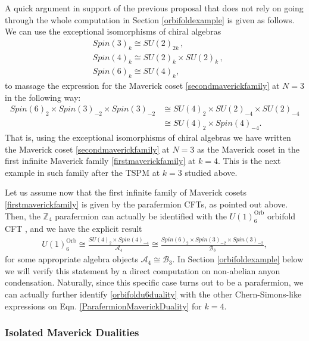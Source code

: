 \documentclass[11pt]{article}
\numberwithin{equation}{section}
\begin{document}
A quick argument in support of the previous proposal that does not rely on going through the whole computation in Section \ref{orbifoldexample} is given as follows. We can use the exceptional isomorphisms of chiral algebras
\begin{align}
    &Spin(3)_{k} \cong SU(2)_{2k} \, , \\[0.3cm]
    &Spin(4)_{k} \cong SU(2)_{k} \times SU(2)_{k} \, ,  \\[0.3cm]
    &Spin(6)_{k} \cong SU(4)_{k}, \, 
\end{align}
to massage the expression for the Maverick coset \eqref{secondmaverickfamily} at $N=3$ in the following way:
\begin{align}
    Spin(6)_{2} \times Spin(3)_{-2} \times Spin(3)_{-2} &\cong SU(4)_{2} \times SU(2)_{-4} \times SU(2)_{-4} \\[0.3cm] &\cong SU(4)_{2} \times Spin(4)_{-4}.
\end{align}
That is, using the exceptional isomorphisms of chiral algebras we have written the Maverick coset \eqref{secondmaverickfamily} at $N=3$ as the Maverick coset in the first infinite Maverick family \eqref{firstmaverickfamily} at $k=4$. This is the next example in such family after the TSPM at $k=3$ studied above.

Let us assume now that the first infinite family of Maverick cosets \eqref{firstmaverickfamily} is given by the parafermion CFTs, as pointed out above. Then, the $\mathbb{Z}_{4}$ parafermion can actually be identified with the $U(1)_{6}^{\mathrm{Orb}}$ orbifold CFT \cite{DiFrancesco:1997nk}, and we have the explicit result
\begin{align}
     U(1)_{6}^{\mathrm{Orb}} \cong \frac{SU(4)_{2} \times Spin(4)_{-4}}{\mathcal{A}_{4}} \cong \frac{Spin(6)_{2} \times Spin(3)_{-2} \times Spin(3)_{-2}}{\mathcal{B}_{3}}, \label{orbifoldu6duality}
\end{align}
for some appropriate algebra objects $\mathcal{A}_{4} \cong \mathcal{B}_{3}$. In Section \ref{orbifoldexample} below we will verify this statement by a direct computation on non-abelian anyon condensation. Naturally, since this specific case turns out to be a parafermion, we can actually further identify \eqref{orbifoldu6duality} with the other Chern-Simons-like expressions on Eqn. \eqref{ParafermionMaverickDuality} for $k=4$. 

\subsubsection*{Isolated Maverick Dualities}
\end{document}
